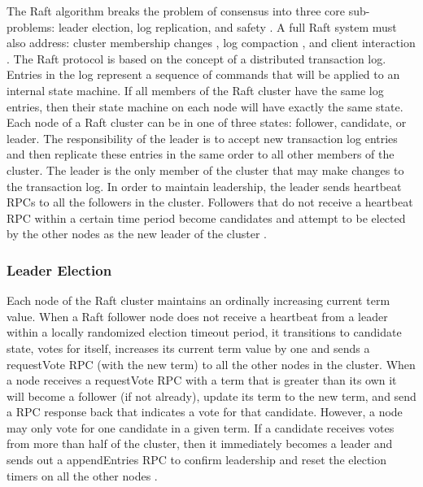 \documentclass[9pt]{extarticle}
\begin{document}
\begin{multicols}{2}
The Raft algorithm breaks the problem of consensus into three core
sub-problems: leader election, log replication, and safety
\cite[Section~3]{raft_thesis:ongaro14}. A full Raft system must also
address: cluster membership changes
\cite[Section~4]{raft_thesis:ongaro14}, log compaction
\cite[Section~5]{raft_thesis:ongaro14}, and client
interaction \cite[Section~6]{raft_thesis:ongaro14}. The Raft protocol
is based on the concept of a distributed transaction log. Entries in
the log represent a sequence of commands that will be applied to an
internal state machine. If all members of the Raft cluster have the
same log entries, then their state machine on each node will have
exactly the same state. Each node of a Raft cluster can be in one of
three states: follower, candidate, or leader. The responsibility of
the leader is to accept new transaction log entries and then
replicate these entries in the same order to all other members of the
cluster. The leader is the only member of the cluster that may make
changes to the transaction log. In order to maintain leadership, the
leader sends heartbeat RPCs to all the followers in the cluster.
Followers that do not receive a heartbeat RPC within a certain time
period become candidates and attempt to be elected by the other nodes
as the new leader of the cluster \cite[p.~12]{raft_thesis:ongaro14}.

\subsubsection{Leader Election}

Each node of the Raft cluster maintains an ordinally increasing
current term value. When a Raft follower node does not receive
a heartbeat from a leader within a locally randomized election timeout period, it
transitions to candidate state, votes for itself, increases its
current term value by one and sends a requestVote RPC (with the
new term) to all the other nodes in the cluster. When a node receives
a requestVote RPC with a term that is greater than its own it will
become a follower (if not already), update its term to the new term,
and send a RPC response back that indicates a vote for that candidate.
However, a node may only vote for one candidate in a given term. If
a candidate receives votes from more than half of the cluster, then it
immediately becomes a leader and sends out a appendEntries RPC to
confirm leadership and reset the election timers on all the other
nodes \cite[Section~3.4]{raft_thesis:ongaro14}.


\end{multicols}
\end{document}
